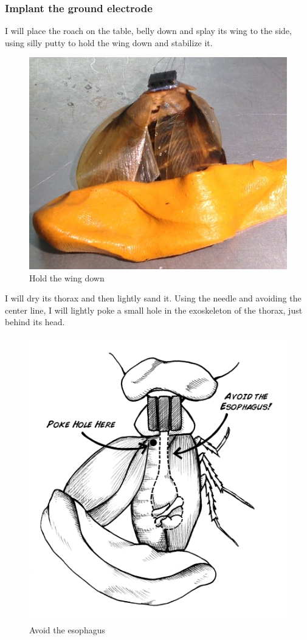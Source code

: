 \subsubsection{Implant the ground electrode}
I will place the roach on the table, belly down and splay its wing to the side, using silly putty to hold the wing down and stabilize it. 
{\begin{figure}[ht!]
\centering
\includegraphics[scale=0.25]{Surgery Photos/putty.jpg}
\caption{Hold the wing down}
\label{fig:putty}
\end{figure}}
I will dry its thorax and then lightly sand it. Using the needle and avoiding the center line, I will lightly poke a small hole in the exoskeleton of the thorax, just behind its head. 
{\begin{figure}[ht!]
\centering
\includegraphics[scale=0.5]{Surgery Photos/avoidesoph.jpg}
\caption{Avoid the esophagus}
\label{fig:avoidesoph}
\end{figure}}
